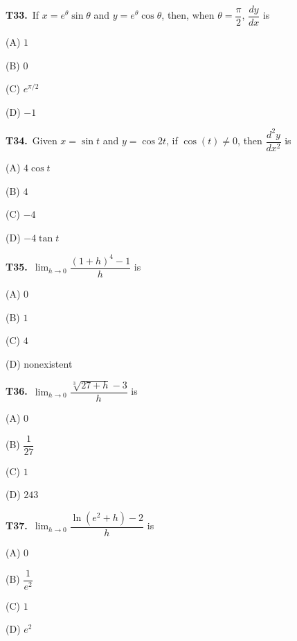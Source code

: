 \documentclass[11pt]{article}
\begin{document}
\bigskip\noindent\textbf{T33.}\ If $x = e^\theta \sin\theta$ and $y = e^\theta \cos\theta$, then, when $\theta = \dfrac{\pi}{2}$, $\dfrac{dy}{dx}$ is
\begin{list}{}{\setlength{\leftmargin}{3em}\setlength{\labelwidth}{2.5em}\setlength{\itemsep}{0pt}\setlength{\topsep}{2pt}}
\item[(A)] $1$
\item[(B)] $0$
\item[(C)] $e^{\pi/2}$
\item[(D)] $-1$
\end{list}

\bigskip\noindent\textbf{T34.}\ Given $x = \sin t$ and $y = \cos 2t$, if $\cos(t) \neq 0$, then $\dfrac{d^2y}{dx^2}$ is
\begin{list}{}{\setlength{\leftmargin}{3em}\setlength{\labelwidth}{2.5em}\setlength{\itemsep}{0pt}\setlength{\topsep}{2pt}}
\item[(A)] $4\cos t$
\item[(B)] $4$
\item[(C)] $-4$
\item[(D)] $-4\tan t$
\end{list}

\bigskip\noindent\textbf{T35.}\ $\displaystyle\lim_{h\to 0}\dfrac{(1+h)^4-1}{h}$ is
\begin{list}{}{\setlength{\leftmargin}{3em}\setlength{\labelwidth}{2.5em}\setlength{\itemsep}{0pt}\setlength{\topsep}{2pt}}
\item[(A)] $0$
\item[(B)] $1$
\item[(C)] $4$
\item[(D)] nonexistent
\end{list}

\bigskip\noindent\textbf{T36.}\ $\displaystyle\lim_{h\to 0}\dfrac{\sqrt[3]{27+h}-3}{h}$ is
\begin{list}{}{\setlength{\leftmargin}{3em}\setlength{\labelwidth}{2.5em}\setlength{\itemsep}{0pt}\setlength{\topsep}{2pt}}
\item[(A)] $0$
\item[(B)] $\dfrac{1}{27}$
\item[(C)] $1$
\item[(D)] $243$
\end{list}

\bigskip\noindent\textbf{T37.}\ $\displaystyle\lim_{h\to 0}\dfrac{\ln(e^2+h)-2}{h}$ is
\begin{list}{}{\setlength{\leftmargin}{3em}\setlength{\labelwidth}{2.5em}\setlength{\itemsep}{0pt}\setlength{\topsep}{2pt}}
\item[(A)] $0$
\item[(B)] $\dfrac{1}{e^2}$
\item[(C)] $1$
\item[(D)] $e^2$
\end{list}
\end{document}
